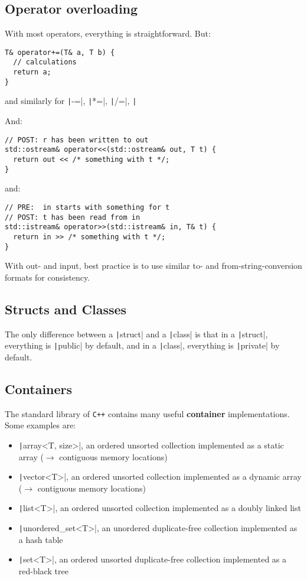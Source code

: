 \documentclass[fontsize=9pt, paper=landscape]{scrartcl}
\begin{document}
\begin{multicols}{2}
\subsection{Operator overloading}

With most operators, everything is straightforward. But:

\begin{verbatim}
T& operator+=(T& a, T b) {
  // calculations
  return a;
}
\end{verbatim}
and similarly for \texttt|-=|, \texttt|*=|, \texttt|/=|, \texttt|%

And:

\begin{verbatim}
// POST: r has been written to out
std::ostream& operator<<(std::ostream& out, T t) {
  return out << /* something with t */;
}
\end{verbatim}
and:

\begin{verbatim}
// PRE:  in starts with something for t
// POST: t has been read from in
std::istream& operator>>(std::istream& in, T& t) {
  return in >> /* something with t */;
}
\end{verbatim}

With out- and input, best practice is to use similar to- and from-string-conversion formats for consistency.

\subsection{Structs and Classes}

The only difference between a \texttt|struct| and a \texttt|class| is that in a \texttt|struct|, everything is \texttt|public| by default, and in a \texttt|class|, everything is \texttt|private| by default.

\subsection{Containers}

The standard library of \texttt{C++} contains many useful \textbf{container} implementations. Some examples are:
\begin{itemize}
	\item \texttt|array<T, size>|, an ordered unsorted collection implemented as a static array ($\rightarrow$ contiguous memory locations)
	\item \texttt|vector<T>|, an ordered unsorted collection implemented as a dynamic array ($\rightarrow$ contiguous memory locations)
	\item \texttt|list<T>|, an ordered unsorted collection implemented as a doubly linked list
	\item \texttt|unordered_set<T>|, an unordered duplicate-free collection implemented as a hash table
	\item \texttt|set<T>|, an ordered unsorted duplicate-free collection implemented as a red-black tree
\end{itemize}


\end{multicols}
\end{document}
